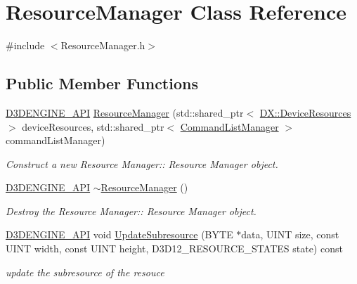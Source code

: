 \hypertarget{class_resource_manager}{}\section{Resource\+Manager Class Reference}
\label{class_resource_manager}


{\ttfamily \#include $<$Resource\+Manager.\+h$>$}

\subsection*{Public Member Functions}
\begin{DoxyCompactItemize}
\item 
\mbox{\hyperlink{stdafx_8h_a8ee2d990c5dfba7794dd2b60741d7722}{D3\+D\+E\+N\+G\+I\+N\+E\+\_\+\+A\+PI}} \mbox{\hyperlink{class_resource_manager_a5705bb19a33d73b09888aa2f119105fe}{Resource\+Manager}} (std\+::shared\+\_\+ptr$<$ \mbox{\hyperlink{class_d_x_1_1_device_resources}{D\+X\+::\+Device\+Resources}} $>$ device\+Resources, std\+::shared\+\_\+ptr$<$ \mbox{\hyperlink{class_command_list_manager}{Command\+List\+Manager}} $>$ command\+List\+Manager)
\begin{DoxyCompactList}\small\item\em Construct a new Resource Manager\+:\+: Resource Manager object. \end{DoxyCompactList}\item 
\mbox{\hyperlink{stdafx_8h_a8ee2d990c5dfba7794dd2b60741d7722}{D3\+D\+E\+N\+G\+I\+N\+E\+\_\+\+A\+PI}} \mbox{\hyperlink{class_resource_manager_a671c186e4630599e7e36d000c53eaf80}{$\sim$\+Resource\+Manager}} ()
\begin{DoxyCompactList}\small\item\em Destroy the Resource Manager\+:\+: Resource Manager object. \end{DoxyCompactList}\item 
\mbox{\hyperlink{stdafx_8h_a8ee2d990c5dfba7794dd2b60741d7722}{D3\+D\+E\+N\+G\+I\+N\+E\+\_\+\+A\+PI}} void \mbox{\hyperlink{class_resource_manager_af0b7ab70d363c108f6ca1bde1dcd06fc}{Update\+Subresource}} (B\+Y\+TE $\ast$data, U\+I\+NT size, const U\+I\+NT width, const U\+I\+NT height, D3\+D12\+\_\+\+R\+E\+S\+O\+U\+R\+C\+E\+\_\+\+S\+T\+A\+T\+ES state) const
\begin{DoxyCompactList}\small\item\em update the subresource of the resouce \end{DoxyCompactList}\item 

\end{DoxyCompactItemize}
